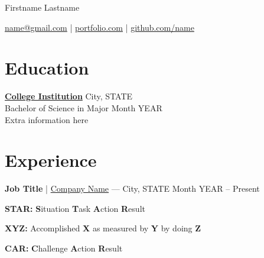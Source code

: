 \documentclass[letterpaper,11pt]{article}
\newcommand*{\Degree}[6]{
  \textbf{\href{#5}{#2}} \hfill {\small #4} \\
  {#3} \hfill {\small #1} \\
  {\footnotesize #6}
}
\newcommand*{\Job}[6]{
  \textbf{#2} | \href{#5}{#3} --- {\small #4} \hfill {\small #1} \\
  \vspace{-9pt}
  \begin{itemize}
    {#6}
  \end{itemize}
}
\begin{document}

\centerline{\Huge Firstname Lastname}

\vspace{5pt}

\centerline{\href{mailto:name@gmail.com}{name@gmail.com} | \href{https://www.portfolio.com}{portfolio.com} | \href{https://github.com}{github.com/name}}

\vspace{-10pt}


\section*{Education}

\Degree
  {Month YEAR}                      %
  {College Institution}             %
  {Bachelor of Science in Major}    %
  {City, STATE}                     %
  {https://college-website.edu}     %
  {Extra information here}          %

\vspace{-6.5pt}


\section*{Experience}

\Job
  {Month YEAR -- Present}         %
  {Job Title}                     %
  {Company Name}                  %
  {City, STATE}                   %
  {https://company-website.com}   %
  {
    \item \textbf{STAR:} \textbf{S}ituation \textbf{T}ask \textbf{A}ction \textbf{R}esult
    \item \textbf{XYZ:} Accomplished \textbf{X} as measured by \textbf{Y} by doing \textbf{Z}
    \item \textbf{CAR:} \textbf{C}hallenge \textbf{A}ction \textbf{R}esult
  } %
\end{document}
